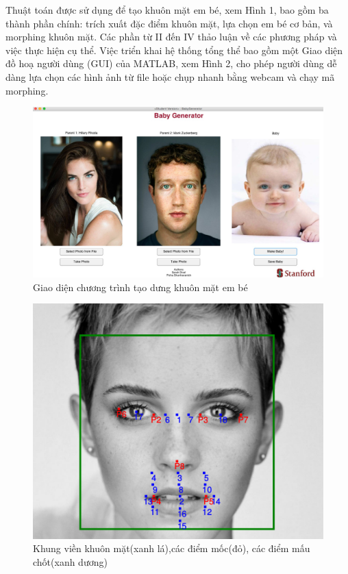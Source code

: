 \documentclass[conference]{IEEEtran}
\begin{document}
Thuật toán được sử dụng để tạo khuôn mặt em bé, xem Hình 1, bao gồm ba thành phần chính: trích xuất đặc điểm khuôn mặt, lựa chọn em bé cơ bản, và morphing khuôn mặt. Các phần từ II đến IV thảo luận về các phương pháp và việc thực hiện cụ thể. Việc triển khai hệ thống tổng thể bao gồm một Giao diện đồ hoạ người dùng (GUI) của MATLAB, xem Hình 2, cho phép người dùng dễ dàng lựa chọn các hình ảnh từ file hoặc chụp nhanh bằng webcam và chạy mã morphing.
\begin{center}
    \begin{figure}[!t]
    \begin{center}
     \includegraphics[scale=1]{Images/11}
    \end{center}
    \caption{Giao diện chương trình tạo dưng khuôn mặt em bé}
    \label{refhinh2}
    \end{figure}
    \begin{figure}[!t]
    \begin{center}
     \includegraphics[scale=0.4]{Images/64}
    \end{center}
    \caption{Khung viền khuôn mặt(xanh lá),các điểm mốc(đỏ), các điểm mấu chốt(xanh dương)}
    \label{refhinh3}
    \end{figure}
\end{center}
\end{document}
